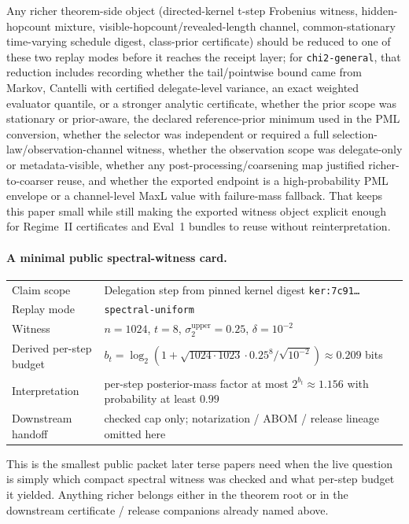 \documentclass[11pt]{article}
\begin{document}
Any richer theorem-side object (directed-kernel t-step Frobenius witness, hidden-hopcount mixture, visible-hopcount/revealed-length channel, common-stationary time-varying schedule digest, class-prior certificate) should be reduced to one of these two replay modes before it reaches the receipt layer; for \texttt{chi2-general}, that reduction includes recording whether the tail/pointwise bound came from Markov, Cantelli with certified delegate-level variance, an exact weighted evaluator quantile, or a stronger analytic certificate, whether the prior scope was stationary or prior-aware, the declared reference-prior minimum used in the PML conversion, whether the selector was independent or required a full selection-law/observation-channel witness, whether the observation scope was delegate-only or metadata-visible, whether any post-processing/coarsening map justified richer-to-coarser reuse, and whether the exported endpoint is a high-probability PML envelope or a channel-level MaxL value with failure-mass fallback.
That keeps this paper small while still making the exported witness object explicit enough for Regime~II certificates and Eval~1 bundles to reuse without reinterpretation.\cite{series:condcert,series:notcert}

\paragraph{A minimal public spectral-witness card.}
\begin{center}\small
\begin{tabular}{@{}ll@{}}
Claim scope & Delegation step from pinned kernel digest \texttt{ker:7c91\ldots} \\
Replay mode & \texttt{spectral-uniform} \\
Witness & $n=1024$, $t=8$, $\sigma_2^{\mathrm{upper}}=0.25$, $\delta=10^{-2}$ \\
Derived per-step budget & $b_t=\log_2(1+\sqrt{1024\cdot 1023}\cdot 0.25^8/\sqrt{10^{-2}})\approx 0.209$ bits \\
Interpretation & per-step posterior-mass factor at most $2^{b_t}\approx 1.156$ with probability at least $0.99$ \\
Downstream handoff & checked cap only; notarization / ABOM / release lineage omitted here \\
\end{tabular}
\end{center}
This is the smallest public packet later terse papers need when the live question is simply which compact spectral witness was checked and what per-step budget it yielded. Anything richer belongs either in the theorem root or in the downstream certificate / release companions already named above.
\end{document}
